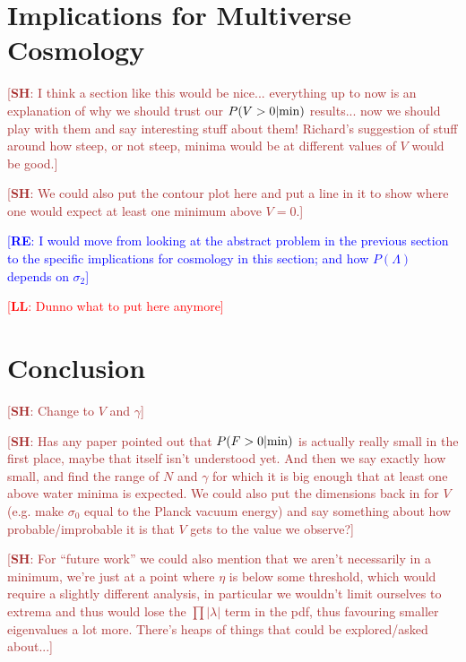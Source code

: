 \documentclass[12pt]{article}
\newcommand{\re}[1]{\textcolor{blue}{[{\bf RE}: #1]}}
\newcommand{\lfl}[1]{\textcolor{red}{[{\bf LL}: #1]}}
\newcommand{\SH}[1]{\textcolor{brown}{[{\bf SH}: #1]}}
\begin{document}

\section{Implications for Multiverse Cosmology}

\SH{I think a section like this would be nice... everything up to now is an explanation of why we should trust our $P(V>0|{\rm min})$ results... now we should play with them and say interesting stuff about them! Richard's suggestion of stuff around how steep, or not steep, minima would be at different values of $V$ would be good.}

\SH{We could also put the contour plot here and put a line in it to show where one would expect at least one minimum above $V=0$.}
  
\re{I would move from looking at the abstract problem in the previous section to the specific implications for cosmology in this section; and how $P(\Lambda)$ depends on $\sigma_2$}

\lfl{Dunno what to put here anymore}

\section{Conclusion}
\SH{Change to $V$ and $\gamma$}

\SH{Has any paper pointed out that $P(F>0|{\rm min})$ is actually really small in the first place, maybe that itself isn't understood yet. And then we say exactly how small, and find the range of $N$ and $\gamma$ for which it is big enough that at least one above water minima is expected. We could also put the dimensions back in for $V$ (e.g. make $\sigma_0$ equal to the Planck vacuum energy)  and say something about how probable/improbable it is that $V$ gets to the value we observe?}

\SH{For ``future work'' we could also mention that we aren't necessarily in a minimum, we're just at a point where $\eta$ is below some threshold, which would require a slightly different analysis, in particular we wouldn't limit ourselves to extrema and thus would lose the $\prod |\lambda|$ term in the pdf, thus favouring smaller eigenvalues a lot more. There's heaps of things that could be explored/asked about...}
\end{document}
